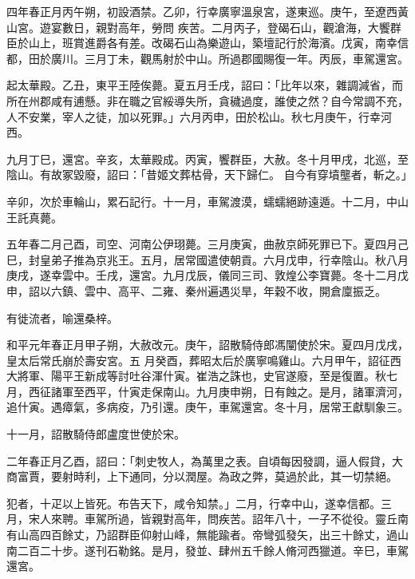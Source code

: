 \begin{pinyinscope}
 四年春正月丙午朔，初設酒禁。乙卯，行幸廣寧溫泉宮，遂東巡。庚午，至遼西黃山宮。遊宴數日，親對高年，勞問
 疾苦。二月丙子，登碣石山，觀滄海，大饗群臣於山上，班賞進爵各有差。改碣石山為樂遊山，築壇記行於海濱。戊寅，南幸信都，田於廣川。三月丁未，觀馬射於中山。所過郡國賜復一年。丙辰，車駕還宮。



 起太華殿。乙丑，東平王陸俟薨。夏五月壬戌，詔曰：「比年以來，雜調減省，而所在州郡咸有逋懸。非在職之官綏導失所，貪穢過度，誰使之然？自今常調不充，人不安業，宰人之徒，加以死罪。」六月丙申，田於松山。秋七月庚午，行幸河西。



 九月丁巳，還宮。辛亥，太華殿成。丙寅，饗群臣，大赦。冬十月甲戌，北巡，至陰山。有故冢毀廢，詔曰：「昔姬文葬枯骨，天下歸仁。
 自今有穿墳壟者，斬之。」



 辛卯，次於車輪山，累石記行。十一月，車駕渡漠，蠕蠕絕跡遠遁。十二月，中山王託真薨。



 五年春二月己酉，司空、河南公伊珝薨。三月庚寅，曲赦京師死罪已下。夏四月己巳，封皇弟子推為京兆王。五月，居常國遣使朝貢。六月戊申，行幸陰山。秋八月庚戌，遂幸雲中。壬戌，還宮。九月戊辰，儀同三司、敦煌公李寶薨。冬十二月戊申，詔以六鎮、雲中、高平、二雍、秦州遍遇災旱，年穀不收，開倉廩振乏。



 有徙流者，喻還桑梓。



 和平元年春正月甲子朔，大赦改元。庚午，詔散騎侍郎馮闡使於宋。夏四月戊戌，皇太后常氏崩於壽安宮。五
 月癸酉，葬昭太后於廣寧鳴雞山。六月甲午，詔征西大將軍、陽平王新成等討吐谷渾什寅。崔浩之誅也，史官遂廢，至是復置。秋七月，西征諸軍至西平，什寅走保南山。九月庚申朔，日有蝕之。是月，諸軍濟河，追什寅。遇瘴氣，多病疫，乃引還。庚午，車駕還宮。冬十月，居常王獻馴象三。



 十一月，詔散騎侍郎盧度世使於宋。



 二年春正月乙酉，詔曰：「刺史牧人，為萬里之表。自頃每因發調，逼人假貸，大商富賈，要射時利，上下通同，分以潤屋。為政之弊，莫過於此，其一切禁絕。



 犯者，十疋以上皆死。布告天下，咸令知禁。」二月，行幸中山，遂幸信都。三
 月，宋人來聘。車駕所過，皆親對高年，問疾苦。詔年八十，一子不從役。靈丘南有山高四百餘丈，乃詔群臣仰射山峰，無能踰者。帝彎弧發矢，出三十餘丈，過山南二百二十步。遂刊石勒銘。是月，發並、肆州五千餘人脩河西獵道。辛巳，車駕還宮。




\end{pinyinscope}
